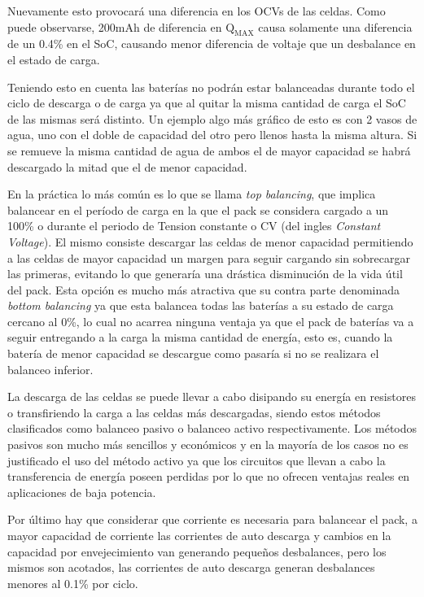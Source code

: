 \documentclass[10pt,a4paper]{article}
\begin{document}
	Nuevamente esto provocará una diferencia en los OCVs de las celdas. 
    Como puede observarse, 200mAh de diferencia en $\mathrm{Q_{MAX}}$ causa 
    solamente una diferencia de un 0.4\% en el SoC, causando menor diferencia de 
    voltaje que un desbalance en el estado de carga.
	
	Teniendo esto en cuenta las baterías no podrán estar balanceadas durante 
    todo el ciclo de descarga o de carga ya que al quitar la misma cantidad de 
    carga el SoC de las mismas será distinto. Un ejemplo algo más gráfico de 
    esto es con 2 vasos de agua, uno con el doble de capacidad del otro pero 
    llenos hasta la misma altura. Si se remueve la misma cantidad de agua de 
    ambos el de mayor capacidad se habrá descargado la mitad que el de menor 
    capacidad.
	
	En la práctica lo más común es lo que se llama \emph{top balancing}, que 
    implica balancear en el período de carga en la que el pack se considera
    cargado a un 100\% o durante el periodo de Tension constante o CV (del
    ingles \emph{Constant Voltage}). El mismo consiste descargar las celdas de 
    menor capacidad permitiendo a las celdas de mayor capacidad un margen para 
    seguir cargando sin sobrecargar las primeras, evitando lo que generaría una 
    drástica disminución de la vida útil del pack. Esta opción es mucho más 
    atractiva que su contra parte denominada \emph{bottom balancing} ya que 
    esta balancea todas las baterías a su estado de carga cercano al 0\%, lo 
    cual no acarrea ninguna ventaja ya que el pack de baterías va a seguir 
    entregando a la carga la misma cantidad de energía, esto es, cuando la 
    batería de menor capacidad se descargue como pasaría si no se realizara el 
    balanceo inferior.
	
	
	La descarga de las celdas se puede llevar a cabo disipando su energía en 
    resistores o transfiriendo la carga a las celdas más descargadas, 
    siendo estos métodos clasificados como balanceo pasivo o balanceo activo 
    respectivamente. Los métodos pasivos son mucho más sencillos y económicos y 
    en la mayoría de los casos no es justificado el uso del método activo ya que 
    los circuitos que llevan a cabo la transferencia de energía poseen perdidas 
    por lo que no ofrecen ventajas reales en aplicaciones de baja potencia.
	
	Por último hay que considerar que corriente es necesaria para balancear el 
    pack, a mayor capacidad de corriente las corrientes de auto descarga y 
    cambios en la capacidad por envejecimiento van generando pequeños desbalances, 
    pero los mismos son acotados, las corrientes de auto descarga generan 
    desbalances menores al 0.1\% por ciclo. 
	
\end{document}
